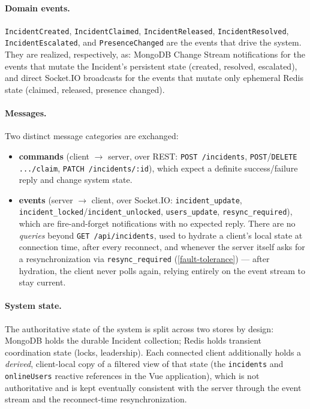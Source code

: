 \documentclass{scrartcl}
\begin{document}
\paragraph{Domain events.} \texttt{IncidentCreated}, \texttt{IncidentClaimed}, \texttt{IncidentReleased}, \texttt{IncidentResolved}, \texttt{IncidentEscalated}, and \texttt{PresenceChanged} are the events that drive the system. They are realized, respectively, as: MongoDB Change Stream notifications for the events that mutate the Incident's persistent state (created, resolved, escalated), and direct Socket.IO broadcasts for the events that mutate only ephemeral Redis state (claimed, released, presence changed).
 
\paragraph{Messages.} Two distinct message categories are exchanged: 
\begin{itemize}
  \item \textbf{commands} (client $\to$ server, over REST: \texttt{POST /incidents}, \texttt{POST}/\texttt{DELETE .../claim}, \texttt{PATCH /incidents/:id}), which expect a definite success/failure reply and change system state.
  \item \textbf{events} (server $\to$ client, over Socket.IO: \texttt{incident\_update}, \texttt{incident\_locked}/\texttt{incident\_unlocked}, \texttt{users\_update}, \texttt{resync\_required}), which are fire-and-forget notifications with no expected reply. There are no \emph{queries} beyond \texttt{GET /api/incidents}, used to hydrate a client's local state at connection time, after every reconnect, and whenever the server itself asks for a resynchronization via \texttt{resync\_required} (\cref{fault-tolerance}) --- after hydration, the client never polls again, relying entirely on the event stream to stay current.
\end{itemize}
 
\paragraph{System state.} The authoritative state of the system is split across two stores by design: MongoDB holds the durable Incident collection; Redis holds transient coordination state (locks, leadership). Each connected client additionally holds a \emph{derived}, client-local copy of a filtered view of that state (the \texttt{incidents} and \texttt{onlineUsers} reactive references in the Vue application), which is not authoritative and is kept eventually consistent with the server through the event stream and the reconnect-time resynchronization.
 
\end{document}
